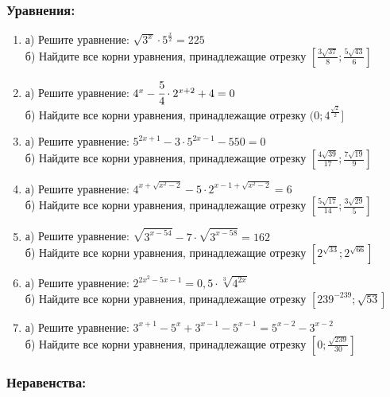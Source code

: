 \documentclass[12pt]{article}
\begin{document}
\subsubsection*{Уравнения:}

\begin{enumerate}[start=1,label={\itshape\bfseries \arabic*.}]

\item а) Решите уравнение: $\sqrt{3^x} \cdot 5^{\frac{x}{2}} = 225$\\
      б) Найдите все корни уравнения, принадлежащие отрезку $[\frac{3\sqrt{37}}{8}; \frac{5\sqrt{43}}{6}] $

\item а) Решите уравнение: $4^x - \cfrac{5}{4} \cdot 2^{x + 2} + 4 = 0 $\\
      б) Найдите все корни уравнения, принадлежащие отрезку $(0; 4^{\frac{\sqrt{2}}{2}}]$

 \item а) Решите уравнение: $5^{2x + 1} - 3 \cdot 5^{2x - 1} -550 = 0$\\
       б) Найдите все корни уравнения, принадлежащие отрезку $[\frac{4\sqrt{39}}{17}; \frac{7\sqrt{19}}{9}]$


\item а) Решите уравнение: $4^{x + \sqrt{x^2 -2 }} - 5 \cdot 2^{x - 1 + \sqrt{x^2 - 2}} = 6$\\
      б) Найдите все корни уравнения, принадлежащие отрезку $[\frac{5\sqrt{17}}{14}; \frac{3\sqrt{29}}{5}]$

\item а) Решите уравнение: $\sqrt{3^{x - 54}} - 7 \cdot \sqrt{3^{x - 58}} = 162$\\
      б) Найдите все корни уравнения, принадлежащие отрезку $[2^{\sqrt{33}};2^{\sqrt{66}} ]$

\item а) Решите уравнение: $2^{2x^2 - 5x - 1} = 0,5 \cdot \sqrt[3]{4^{2x}}$\\
      б) Найдите все корни уравнения, принадлежащие отрезку $[239^{-239}; \sqrt{53}]$

\item а) Решите уравнение: $3^{x + 1} - 5^x + 3^{x - 1} - 5^{x - 1} = 5^{x - 2} - 3^{x - 2}$\\
      б) Найдите все корни уравнения, принадлежащие отрезку $[0; \frac{\sqrt{239}}{30}]$

\end{enumerate}

\subsubsection*{Неравенства:}
\end{document}
